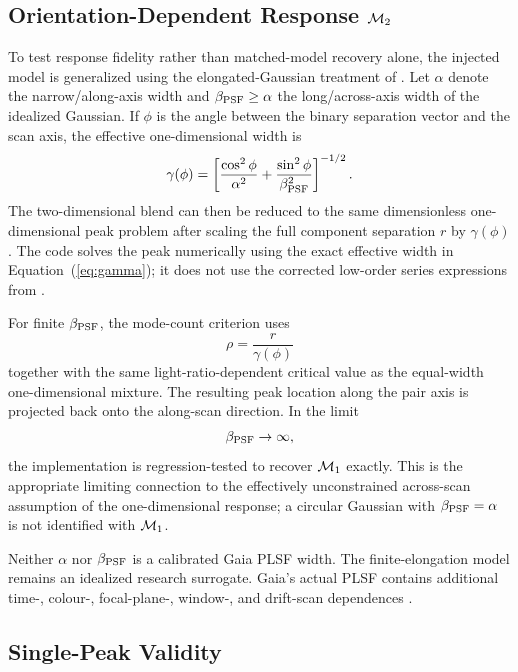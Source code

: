 \subsection{Orientation-Dependent Response $\mathcal{M}_2$}

To test response fidelity rather than matched-model recovery alone, the injected model is generalized using the elongated-Gaussian treatment of \citet{Penoyre2026}. Let $\alpha$ denote the narrow/along-axis width and $\beta_{\rm PSF}\geq\alpha$ the long/across-axis width of the idealized Gaussian. If $\phi$ is the angle between the binary separation vector and the scan axis, the effective one-dimensional width is
\begin{equation}
\gamma(\phi)=
\left[
\frac{\cos^2\phi}{\alpha^2}
+\frac{\sin^2\phi}{\beta_{\rm PSF}^2}
\right]^{-1/2}.
\label{eq:gamma}
\end{equation}
The two-dimensional blend can then be reduced to the same dimensionless one-dimensional peak problem after scaling the full component separation $r$ by $\gamma(\phi)$. The code solves the peak numerically using the exact effective width in Equation~(\ref{eq:gamma}); it does not use the corrected low-order series expressions from \citet{Penoyre2026}.

For finite $\beta_{\rm PSF}$, the mode-count criterion uses
\begin{equation}
\rho=\frac{r}{\gamma(\phi)}
\end{equation}
together with the same light-ratio-dependent critical value as the equal-width one-dimensional mixture. The resulting peak location along the pair axis is projected back onto the along-scan direction. In the limit
\begin{equation}
\beta_{\rm PSF}\rightarrow\infty,
\end{equation}
the implementation is regression-tested to recover $\mathcal{M}_1$ exactly. This is the appropriate limiting connection to the effectively unconstrained across-scan assumption of the one-dimensional response; a circular Gaussian with $\beta_{\rm PSF}=\alpha$ is not identified with $\mathcal{M}_1$.

Neither $\alpha$ nor $\beta_{\rm PSF}$ is a calibrated Gaia PLSF width. The finite-elongation model remains an idealized research surrogate. Gaia's actual PLSF contains additional time-, colour-, focal-plane-, window-, and drift-scan dependences \citep{Rowell2021,Rowell2026}.

\subsection{Single-Peak Validity}

